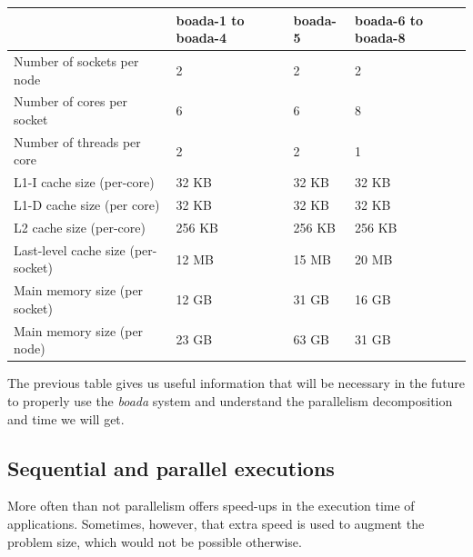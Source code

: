 \documentclass[12]{article}
\begin{document}
\begin{table}[h]
\centering    \begin{tabular}{|l||l|l|l|}
    \hline
                                        & boada-1 to boada-4    & boada-5   & boada-6 to boada-8    \\
    \hline\hline
    Number of sockets per node          & 2                     & 2         & 2                     \\
    \hline
    Number of cores per socket          & 6                     & 6         & 8                     \\
    \hline
    Number of threads per core          & 2                     & 2         & 1                     \\
    \hline
    L1-I cache size (per-core)          & 32 KB                 & 32 KB     & 32 KB                 \\    
    \hline
    L1-D cache size (per core)          & 32 KB                 & 32 KB     & 32 KB                 \\
    \hline
    L2 cache size (per-core)            & 256 KB                & 256 KB    & 256 KB                \\
    \hline
    Last-level cache size (per-socket)  & 12 MB                 & 15 MB     & 20 MB                 \\
    \hline
    Main memory  size (per socket)      & 12 GB                 & 31 GB     & 16 GB                 \\
    \hline
    Main memory size (per node)         & 23 GB                 & 63 GB     & 31 GB                 \\
    \hline
    \end{tabular}
\end{table}

\bigskip

The previous table gives us useful information that will be necessary in the future to properly use the \textit{boada} system and understand the parallelism decomposition and time we will get. 

\subsection{Sequential and parallel executions}

More often than not parallelism offers speed-ups in the execution time of applications. Sometimes, however, that extra speed is used to augment the problem size, which would not be possible otherwise.
\end{document}

